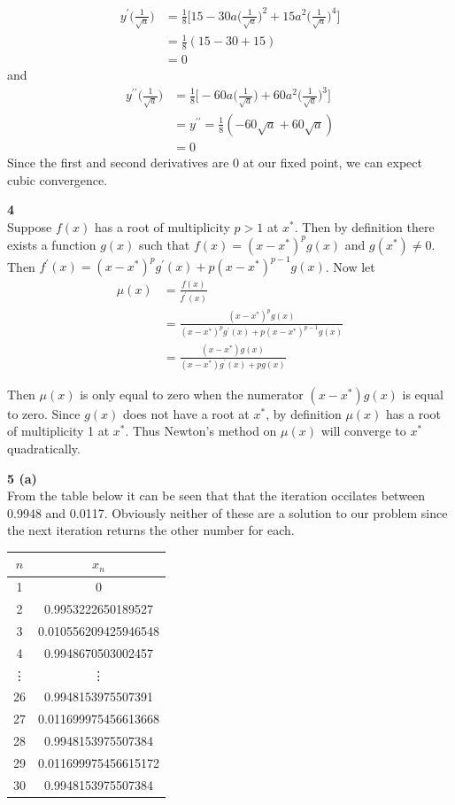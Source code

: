 \documentclass[12pt]{article}
\newcommand{\problem}[1]{\hspace{-4 ex} \large \textbf{#1}\\}
\begin{document}
	\begin{align*}
		y^\prime \Bigg(\frac{1}{\sqrt{a}} \Bigg) & = \frac{1}{8} \Bigg[15 - 30a \Bigg(\frac{1}{\sqrt{a}} \Bigg)^2 + 15a^2 \Bigg(\frac{1}{\sqrt{a}} \Bigg)^4 \Bigg] \\
		& = \frac{1}{8}(15 - 30 + 15) \\
		& = 0
	\end{align*}
	and 
	\begin{align*}
	y^{\prime\prime} \Bigg(\frac{1}{\sqrt{a}} \Bigg) & = \frac{1}{8}\Bigg[-60a \Bigg(\frac{1}{\sqrt{a}} \Bigg)+ 60a^2 \Bigg(\frac{1}{\sqrt{a}} \Bigg)^3\Bigg] \\
	& = y^{\prime\prime} = \frac{1}{8}(-60\sqrt{a} + 60\sqrt{a}) \\
	& = 0
	\end{align*}
	Since the first and second derivatives are 0 at our fixed point, we can expect cubic convergence.
	
	
	
\problem{4}
	Suppose $f(x)$ has a root of multiplicity $p>1$ at $x^*$. Then by definition there exists a function $g(x)$ such that $f(x) = (x-x^*)^pg(x)$ and $g(x^*) \neq 0$. Then $f^\prime(x) = (x-x^*)^pg^\prime(x) + p(x-x^*)^{p-1}g(x)$. Now let 
	\begin{align*}
		\mu(x) & = \frac{f(x)}{f^\prime(x)} \\
		& = \frac{(x-x^*)^pg(x)}{(x-x^*)^pg^\prime(x) + p(x-x^*)^{p-1}g(x)} \\
		& = \frac{(x-x^*)g(x)}{(x-x^*)g^\prime(x) + pg(x)}
	\end{align*}
	
	Then $\mu(x)$ is only equal to zero when the numerator $(x-x^*)g(x)$ is equal to zero. Since $g(x)$ does not have a root at $x^*$, by definition $\mu(x)$ has a root of multiplicity 1 at $x^*$. Thus Newton's method on $\mu(x)$ will converge to $x^*$ quadratically. 
	
\problem{5 (a)}
	From the table below it can be seen that that the iteration occilates between 0.9948 and 0.0117. Obviously neither of these are a solution to our problem since the next iteration returns the other number for each. 
	\singlespacing
	\begin{center}
		\begin{tabular}{|c|c|}
			\hline
			$n$&$x_n$\\ \hline
			1&0\\ \hline
			2&0.9953222650189527\\ \hline
			3&0.010556209425946548\\ \hline
			4&0.9948670503002457\\ \hline
			\vdots & \vdots \\ \hline
			26&0.9948153975507391\\ \hline
			27&0.011699975456613668\\ \hline
			28&0.9948153975507384\\ \hline
			29&0.011699975456615172\\ \hline
			30&0.9948153975507384\\ \hline
		\end{tabular}
	\end{center}
	\doublespacing
	
\end{document}
